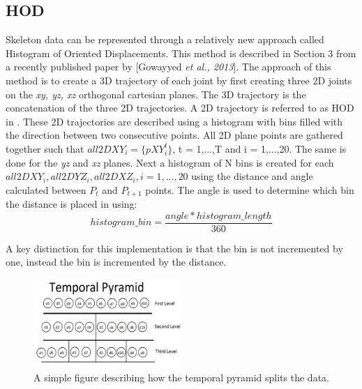 \documentclass[11pt,nocopyrightspace]{config}
\begin{document}
\subsection{HOD}

Skeleton data can be represented through a relatively new approach called Histogram of Oriented Displacements. This method is described in Section 3 from a recently published paper by [Gowayyed \textit{et al., 2013}]. The approach of this method is to create a 3D trajectory of each joint by first creating three 2D joints on the \emph{xy, yz, xz} orthogonal cartesian planes. The 3D trajectory is the concatenation of the three 2D trajectories. A 2D trajectory is referred to as HOD in \cite{hodPaper}. These 2D trajectories are described using a histogram with bins filled with the direction between two consecutive points. All 2D plane points are gathered together such that $all2DXY_i = \{ pXY_i^t \}$, t = 1,...,T and i = 1,...,20. The same is done for the \emph{yz} and \emph{xz} planes. Next a histogram of N bins is created for each $all2DXY_i, all2DYZ_i, all2DXZ_i, i = 1,...,20$ using the distance and angle calculated between $P_t$ and $P_{t+1}$ points. The angle is used to determine which bin the distance is placed in using:
\begin{equation}
histogram\_bin = \frac{angle * histogram\_length}{360}
\end{equation}

A key distinction for this implementation is that the bin is not incremented by one, instead the bin is incremented by the distance.

\begin{figure}
	\centering
	\includegraphics[width=0.5\textwidth]{temporal_pyramid2}
	\caption{A simple figure describing how the temporal pyramid splits the data.}
	\label{fig:hodPyramid}
\end{figure}
\end{document}
